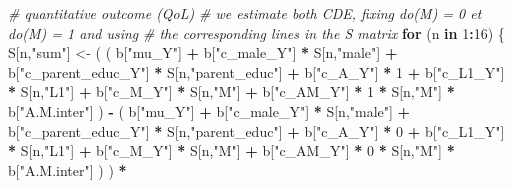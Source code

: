 \documentclass[
]{book}
\newenvironment{Shaded}{\begin{snugshade}}{\end{snugshade}}
\newcommand{\CommentTok}[1]{\textcolor[rgb]{0.56,0.35,0.01}{\textit{#1}}}
\newcommand{\ControlFlowTok}[1]{\textcolor[rgb]{0.13,0.29,0.53}{\textbf{#1}}}
\newcommand{\DecValTok}[1]{\textcolor[rgb]{0.00,0.00,0.81}{#1}}
\newcommand{\NormalTok}[1]{#1}
\newcommand{\OtherTok}[1]{\textcolor[rgb]{0.56,0.35,0.01}{#1}}
\newcommand{\SpecialCharTok}[1]{\textcolor[rgb]{0.81,0.36,0.00}{\textbf{#1}}}
\newcommand{\StringTok}[1]{\textcolor[rgb]{0.31,0.60,0.02}{#1}}
\begin{document}
\begin{Shaded}
\begin{Highlighting}[]
  \CommentTok{\# quantitative outcome (QoL)}
  \CommentTok{\# we estimate both CDE, fixing do(M) = 0 et do(M) = 1 and using }
  \CommentTok{\# the corresponding lines in the S matrix}
  \ControlFlowTok{for}\NormalTok{ (n }\ControlFlowTok{in} \DecValTok{1}\SpecialCharTok{:}\DecValTok{16}\NormalTok{) \{}
\NormalTok{    S[n,}\StringTok{"sum"}\NormalTok{] }\OtherTok{\textless{}{-}}\NormalTok{ ( ( b[}\StringTok{"mu\_Y"}\NormalTok{] }\SpecialCharTok{+} 
\NormalTok{                        b[}\StringTok{"c\_male\_Y"}\NormalTok{] }\SpecialCharTok{*}\NormalTok{ S[n,}\StringTok{"male"}\NormalTok{] }\SpecialCharTok{+} 
\NormalTok{                        b[}\StringTok{"c\_parent\_educ\_Y"}\NormalTok{] }\SpecialCharTok{*}\NormalTok{ S[n,}\StringTok{"parent\_educ"}\NormalTok{] }\SpecialCharTok{+} 
\NormalTok{                        b[}\StringTok{"c\_A\_Y"}\NormalTok{] }\SpecialCharTok{*} \DecValTok{1} \SpecialCharTok{+} 
\NormalTok{                        b[}\StringTok{"c\_L1\_Y"}\NormalTok{] }\SpecialCharTok{*}\NormalTok{ S[n,}\StringTok{"L1"}\NormalTok{] }\SpecialCharTok{+}
\NormalTok{                        b[}\StringTok{"c\_M\_Y"}\NormalTok{] }\SpecialCharTok{*}\NormalTok{ S[n,}\StringTok{"M"}\NormalTok{] }\SpecialCharTok{+}
\NormalTok{                        b[}\StringTok{"c\_AM\_Y"}\NormalTok{] }\SpecialCharTok{*} \DecValTok{1} \SpecialCharTok{*}\NormalTok{ S[n,}\StringTok{"M"}\NormalTok{] }\SpecialCharTok{*}\NormalTok{ b[}\StringTok{"A.M.inter"}\NormalTok{] ) }\SpecialCharTok{{-}} 
\NormalTok{                      ( b[}\StringTok{"mu\_Y"}\NormalTok{] }\SpecialCharTok{+} 
\NormalTok{                          b[}\StringTok{"c\_male\_Y"}\NormalTok{] }\SpecialCharTok{*}\NormalTok{ S[n,}\StringTok{"male"}\NormalTok{] }\SpecialCharTok{+} 
\NormalTok{                          b[}\StringTok{"c\_parent\_educ\_Y"}\NormalTok{] }\SpecialCharTok{*}\NormalTok{ S[n,}\StringTok{"parent\_educ"}\NormalTok{] }\SpecialCharTok{+} 
\NormalTok{                          b[}\StringTok{"c\_A\_Y"}\NormalTok{] }\SpecialCharTok{*} \DecValTok{0} \SpecialCharTok{+} 
\NormalTok{                          b[}\StringTok{"c\_L1\_Y"}\NormalTok{] }\SpecialCharTok{*}\NormalTok{ S[n,}\StringTok{"L1"}\NormalTok{] }\SpecialCharTok{+}
\NormalTok{                          b[}\StringTok{"c\_M\_Y"}\NormalTok{] }\SpecialCharTok{*}\NormalTok{ S[n,}\StringTok{"M"}\NormalTok{] }\SpecialCharTok{+}
\NormalTok{                          b[}\StringTok{"c\_AM\_Y"}\NormalTok{] }\SpecialCharTok{*} \DecValTok{0} \SpecialCharTok{*}\NormalTok{ S[n,}\StringTok{"M"}\NormalTok{] }\SpecialCharTok{*}\NormalTok{ b[}\StringTok{"A.M.inter"}\NormalTok{] ) ) }\SpecialCharTok{*}

\end{Highlighting}
\end{Shaded}
\end{document}
